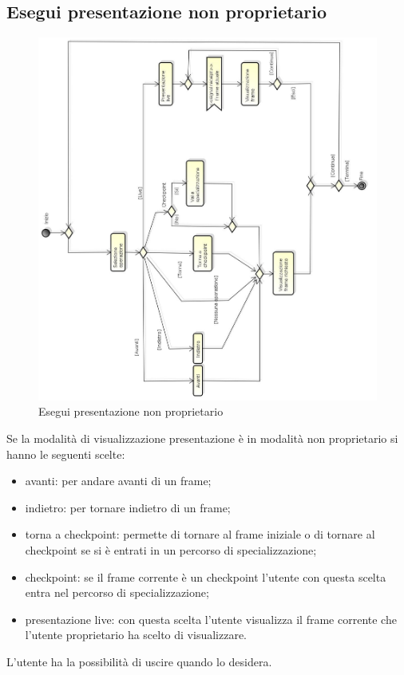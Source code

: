 \newpage

\subsection{Esegui presentazione non proprietario}

\begin{figure}[h!]
		\centering
		\includegraphics[scale=.4]{img/Esegui_presentazione_non_proprietario.jpg}
		\caption{Esegui presentazione non proprietario}		\label{fig:Esegui_presentazione_non_proprietario}
\end{figure}

Se la modalità di visualizzazione presentazione è in modalità non proprietario si hanno le seguenti scelte: 
\begin{itemize}
\item
avanti: per andare avanti di un frame; 
\item 
indietro: per tornare indietro di un frame;
\item torna a checkpoint: permette di tornare al frame iniziale o di tornare al checkpoint se si è entrati in un percorso di specializzazione; 
\item checkpoint: se il frame corrente è un checkpoint l'utente con questa scelta entra nel percorso di specializzazione;
\item presentazione live: con questa scelta l'utente visualizza il frame corrente che l'utente proprietario ha scelto di visualizzare.
\end{itemize}
L'utente ha la possibilità di uscire quando lo desidera.

